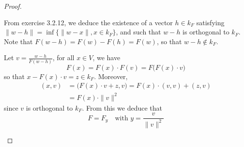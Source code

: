 \documentclass[11pt,a4paper,twoside]{article}
\theoremstyle{definition}
\begin{document}
\begin{proof}
\begin{enumerate}[(a)]
    From exercise 3.2.12, we deduce the existence of a vector $h \in k_F$ satisfying
    $\| w - h \| = \inf \{ \| w - x \|, x \in k_F \}$, and such that $w - h$ is orthogonal to $k_F$. Note that
    $F ( w - h ) = F ( w ) - F ( h ) = F ( w )$, so that $w - h \notin k_F$.

    Let $v = \frac{w - h}{F ( w - h )}$, for all $x \in V$, we have
    \begin{equation*}
      F ( x ) = F ( x ) \cdot F ( v ) = F \big( F ( x ) \cdot v \big)
    \end{equation*}
    so that $x - F ( x ) \cdot v = z \in k_F$. Moreover,
    \begin{align*}
      ( x, v ) &= \big( F ( x ) \cdot v + z, v \big) = F ( x ) \cdot ( v, v ) + ( z, v ) \\
      &= F ( x ) \cdot \| v \|^2
    \end{align*}
    since $v$ is orthogonal to $k_F$. From this we deduce that
    \begin{equation*}
      F = F_y \quad\text{with } y = \frac{v}{\| v \|^2}
    \end{equation*}
    
  \end{enumerate}

\end{proof}
\end{document}
